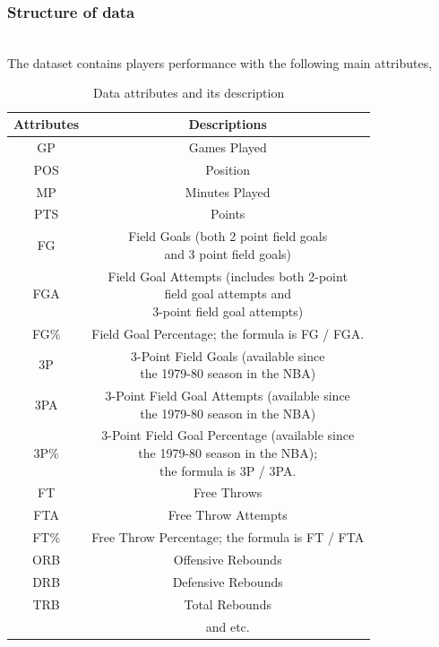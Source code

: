 \documentclass[format=sigconf]{acmart}
\begin{document}
\subsubsection{Structure of data}
\hfill\\
The dataset contains players performance with the following main attributes,
\begin{center}
    \begin{table}[H]
        \begin{tabular}{|c|c|}
            \hline
            \textbf{Attributes} & \textbf{Descriptions} \\
            \hline
            GP & Games Played \\
            \hline
            POS & Position \\
            \hline
            MP & Minutes Played \\
            \hline
            PTS & Points \\
            \hline
            FG & \makecell{Field Goals (both 2 point field goals \\ and 3 point field goals)} \\
            \hline
            FGA & \makecell{Field Goal Attempts (includes both 2-point \\ field goal attempts and \\3-point field goal attempts)} \\
            \hline
            FG\% & Field Goal Percentage; the formula is FG / FGA. \\
            \hline
            3P & \makecell{3-Point Field Goals (available since \\the 1979-80 season in the NBA)} \\
            \hline
            3PA & \makecell{3-Point Field Goal Attempts (available since \\the 1979-80 season in the NBA)} \\
            \hline
            3P\% & \makecell{3-Point Field Goal Percentage (available since \\the 1979-80 season in the NBA); \\the formula is 3P / 3PA.}\\
            \hline
            FT & Free Throws \\
            \hline
            FTA & Free Throw Attempts \\
            \hline
            FT\% & Free Throw Percentage; the formula is FT / FTA\\
            \hline
            ORB & Offensive Rebounds \\
            \hline
            DRB & Defensive Rebounds \\
            \hline
            TRB & Total Rebounds \\
            \hline
             & and etc. \\
            \hline
        \end{tabular}
        \caption{Data attributes and its description}
        \label{tab:attributesTable}
    \end{table}
\end{center}
\end{document}
